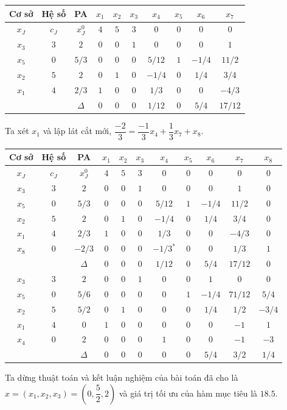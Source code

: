 \documentclass[12pt,a4paper]{report}
\begin{document}
    \begin{center}
        \begin{tabular}{|c|c|c|c|c|c|c|c|c|c|}
        \hline
          Cơ sở & Hệ số & PA& $x_1$ &$x_2$ &$x_3$ &$x_4$ &$x_5$ &$x_6$ &$x_7$ \\
         \hline
          $x_J$& $c_J$ &$x_J^0$ &$4$ &$5$ &$ 3$ &$0$ &$0$ &$0$ &$0$\\
          \hline
          $x_3$ &$3$ &$2$ &$0$ &$0$ &$1$ &$0$ &$0$ &$0$ &$1$\\
          $x_5$ &$0$ &$5/3$ &$0$ &$0$ &$0$ &$5/12$ &$1$ &$-1/4$ &$11/2$\\
          $x_2$ &$5$ &$2$ &$0$ &$1$ &$0$ &$-1/4$ &$0$ &$1/4$ &$3/4$\\
          $x_1$ &$4$ &$2/3$ &$1$ &$0$ &$0$ &$1/3$ &$0$ &$0$ &$-4/3$\\
          \hline
          &&$\Delta$ &$0$ &$0$ &$0$ &$1/12$ &$0$ &$5/4$ &$17/12$\\
          \hline
        \end{tabular}
    \end{center}
    Ta xét $x_1$ và lập lát cắt mới, $\dfrac{-2}{3}= \dfrac{-1}{3}x_4 +\dfrac{1}{3}x_7+x_8$.
    \begin{center}
        \begin{tabular}{|c|c|c|c|c|c|c|c|c|c|c|}
        \hline
          Cơ sở & Hệ số & PA& $x_1$ &$x_2$ &$x_3$ &$x_4$ &$x_5$ &$x_6$ &$x_7$&$x_8$ \\
         \hline
          $x_J$& $c_J$ &$x_J^0$ &$4$ &$5$ &$ 3$ &$0$ &$0$ &$0$ &$0$ &$0$\\
          \hline
           $x_3$ &$3$ &$2$ &$0$ &$0$ &$1$ &$0$ &$0$ &$0$ &$1$ &$0 $\\
          $x_5$ &$0$ &$5/3$ &$0$ &$0$ &$0$ &$5/12$ &$1$ &$-1/4$ &$11/2$ &$0$\\
          $x_2$ &$5$ &$2$ &$0$ &$1$ &$0$ &$-1/4$ &$0$ &$1/4$ &$3/4$ &$0$\\
          $x_1$ &$4$ &$2/3$ &$1$ &$0$ &$0$ &$1/3$ &$0$ &$0$ &$-4/3$ &$0$\\
          $x_8$ &$0$ &$-2/3$ &$0$ &$0$ &$0$ &$-1/3^*$ &$0$ &$0$ &$1/3$ &$1$\\
          \hline
          &&$\Delta$ &$0$ &$0$ &$0$ &$1/12$ &$0$ &$5/4$ &$17/12$ &$0$\\
          \hline
          $x_3$ &$3$ &$2$ &$0$ &$0$ &$1$ &$0$ &$0$ &$1$ &$0$& $0$\\
          $x_5$ &$0$ &$5/6$ &$0$ &$0$ &$0$ &$0$ &$1$ &$-1/4$ &$71/12$ &$5/4$\\
          $x_2$ &$5$ &$5/2$ &$0$ &$1$ &$0$ &$0$ &$0$&$1/4$ &$1/2$ &$-3/4$\\
          $x_1$ &$4$ &$0$ &$1$ &$0$ &$0$ &$0$ &$0$ &$0$ &$-1$ &$1$\\
          $x_4$ &$0$ &$2$ &$0$ &$0$ &$0$ &$1$ &$0$ &$0$ &$-1$ &$-3$\\
          \hline
          &&$\Delta$ &$0$ &$0$ &$0$ &$0$ &$0$ &$5/4$ &$3/2$ &$1/4$\\
          \hline
        \end{tabular}
    \end{center}
    Ta dừng thuật toán và kết luận nghiệm của bài toán đã cho là $x=(x_1,x_2,x_3)=(0,\dfrac{5}{2},2)$ và giá trị tối ưu của hàm mục tiêu là $18.5$.
\end{document}
